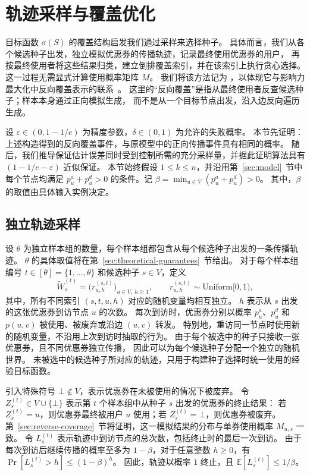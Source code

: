 \section{轨迹采样与覆盖优化}
\label{sec:algo}

目标函数 $\sigma(S)$ 的覆盖结构启发我们通过采样来选择种子。
具体而言，我们从各个候选种子出发，独立模拟优惠券的传播轨迹，记录最终使用优惠券的用户，
再按最终使用者将这些结果归类，建立倒排覆盖索引，并在该索引上执行贪心选择。
这一过程无需显式计算使用概率矩阵 $M$。
我们将该方法记为 \CIMRIS{}，以体现它与影响力最大化中反向覆盖表示的联系~\cite{borgs2014maximizing,tang2015influence}。
这里的“反向覆盖”是指从最终使用者反查候选种子；样本本身通过正向模拟生成，
而不是从一个目标节点出发，沿入边反向遍历生成。

设 $\varepsilon\in(0,1-1/e)$ 为精度参数，$\delta\in(0,1)$ 为允许的失败概率。
本节先证明：上述构造得到的反向覆盖事件，与原模型中的正向传播事件具有相同的概率。
随后，我们推导保证估计误差同时受到控制所需的充分采样量，并据此证明算法具有
$(1-1/e-\varepsilon)$ 近似保证。
本节始终假设 $1\le k\le n$，并沿用第~\ref{sec:model}~节中每个节点均满足
$p_u^a+p_u^d>0$ 的条件。记
$\beta=\min_{u\in V}(p_u^a+p_u^d)>0$。
其中，$\beta$ 的取值由具体输入实例决定。

\subsection{独立轨迹采样}
\label{sec:source-worlds}

设 $\theta$ 为独立样本组的数量，每个样本组都包含从每个候选种子出发的一条传播轨迹。
$\theta$ 的具体取值将在第~\ref{sec:theoretical-guarantees}~节给出。
对于每个样本组编号 $t\in[\theta]=\{1,\ldots,\theta\}$ 和候选种子 $s\in V$，定义
\[
  \widetilde W_s^{(t)}
  =\bigl(r_{u,h}^{(s,t)}\bigr)_{u\in V,\ h\ge1},
  \qquad r_{u,h}^{(s,t)}\sim\mathrm{Uniform}[0,1),
\]
其中，所有不同索引 $(s,t,u,h)$ 对应的随机变量均相互独立。
$h$ 表示从 $s$ 出发的这张优惠券到访节点 $u$ 的次数。
每次到访时，优惠券分别以概率 $p_u^a$、$p_u^d$ 和 $p(u,v)$ 被使用、被废弃或沿边 $(u,v)$ 转发。
特别地，重访同一节点时使用新的随机变量，不沿用上次到访时抽取的行为。
由于每个被选中的种子只接收一张优惠券，且不同优惠券独立传播，
因此可以为每个候选种子分配一个独立的随机世界。
未被选中的候选种子所对应的轨迹，只用于构建种子选择时统一使用的经验目标函数。

引入特殊符号 $\bot\notin V$，表示优惠券在未被使用的情况下被废弃。
令 $Z_s^{(t)}\in V\cup\{\bot\}$ 表示第 $t$ 个样本组中从种子 $s$ 出发的优惠券的终止结果：
若 $Z_s^{(t)}=u$，则优惠券最终被用户 $u$ 使用；若 $Z_s^{(t)}=\bot$，则优惠券被废弃。
第~\ref{sec:reverse-coverage}~节将证明，这一模拟结果的分布与单券使用概率 $M_{u,s}$ 一致。
令 $L_s^{(t)}$ 表示轨迹中到访节点的总次数，包括终止时的最后一次到访。
由于每次到访后继续传播的概率至多为 $1-\beta$，对于任意整数 $h\ge0$，有
$\Pr[L_s^{(t)}>h]\le(1-\beta)^h$。
因此，轨迹以概率 $1$ 终止，且 $\mathbb E[L_s^{(t)}]\le1/\beta$。


